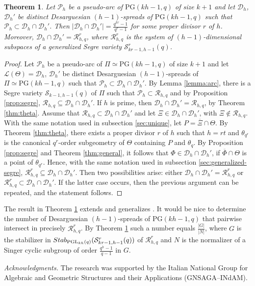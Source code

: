 \documentclass[11pt]{article}
\newtheorem{theorem}{Theorem}[section]
\theoremstyle{definition}
\numberwithin{equation}{section}
\def\cL{\mathcal L}
\def\cP{\mathcal P}
\def\cD{\mathcal D}
\def\cR{\mathcal R}
\def\cS{\mathcal S}
\def\PG{\mathrm{PG}}
\def\PGL{{\rm PGL}}
\begin{document}
\begin{theorem}\label{thm:intersection}
Let $\cP_h$ be a pseudo-arc of $\PG(kh-1, q)$ of size $k+1$ and let $\cD_h$, $\cD_h'$ be distinct Desarguesian $(h-1)$-spreads of $\PG(kh-1, q)$ such that $\cP_h \subset \cD_h \cap \cD_h'$. Then $|\cD_h \cap \cD_h'| = \frac{q^{kr}-1}{q^r-1}$ for some proper divisor $r$ of $h$. Moreover, $\cD_h \cap \cD_h' = \cR^r_{h, q}$, where $\cR^r_{h, q}$ is the system of $(h-1)$-dimensional subspaces of a generalized Segre variety $\cS^r_{kr-1, h-1}(q)$. 
\end{theorem}
\begin{proof}
Let $\cP_h$ be a pseudo-arc of $\Pi \simeq \PG(kh-1, q)$ of size $k+1$ and let $\cL(\Theta) = \cD_h$, $\cD_h'$ be distinct Desarguesian $(h-1)$-spreads of $\Pi \simeq \PG(kh-1, q)$ such that $\cP_h \subset \cD_h \cap \cD_h'$. By Lemma \ref{lemma:arc}, there is a Segre variety $\cS_{k-1, h-1}(q)$ of $\Pi$ such that $\cP_h \subset \cR_{h, q}$ and by Proposition \ref{prop:segre}, $\cR_{h, q} \subseteq \cD_h \cap \cD_h'$. If $h$ is prime, then $\cD_h \cap \cD_h' = \cR_{h, q}$, by Theorem \ref{thm:theta}. Assume that $\cR_{h, q} \subset \cD_h \cap \cD_h'$ and let $\Xi \in \cD_h \cap \cD_h'$, with $\Xi \notin \cR_{h, q}$. With the same notation used in subsection \ref{sec:unique}, let $P = \overline{\Xi} \cap \Theta$. By Theorem \ref{thm:theta}, there exists a proper divisor $r$ of $h$ such that $h = rt$ and $\theta_{q^r}$ is the canonical $q^r$-order subgeometry of $\Theta$ containing $P$ and $\theta_q$. By Proposition \ref{prop:segre} and Theorem \ref{thm:general}, it follows that $\Phi \in \cD_h \cap \cD_h'$, if $\overline{\Phi} \cap \Theta$ is a point of $\theta_{q^r}$. Hence, with the same notation used in subsection \ref{sec:generalized-segre}, $\cR^r_{h, q} \subseteq \cD_h \cap \cD_h'$. Then two possibilities arise: either $\cD_h \cap \cD_h' = \cR^r_{h, q}$ or $\cR^r_{h, q} \subset \cD_h \cap \cD_h'$. If the latter case occurs, then the previous argument can be repeated, and the statement follows.      
\end{proof}

The result in Theorem \ref{thm:intersection} extends and generalizes \cite[Corollary 1.6]{Rottey}. It would be nice to determine the number of Desarguesian $(h-1)$-spreads of $\PG(kh-1, q)$ that pairwise intersect in precisely $\cR^r_{h, q}$. By Theorem \ref{thm:intersection} such a number equals $\frac{|G|}{|N|}$, where $G$ is the stabilizer in $Stab_{\PGL_{kh}(q)}(\cS^r_{kr-1, h-1}(q))$ of $\cR^r_{h, q}$ and $N$ is the normalizer of a Singer cyclic subgroup of order $\frac{q^h-1}{q-1}$ in $G$.

\bigskip
{\footnotesize
\noindent\textit{Acknowledgments.}
The research was supported by the Italian National Group for Algebraic and Geometric Structures and their Applications (GNSAGA--INdAM). }



\end{document}

